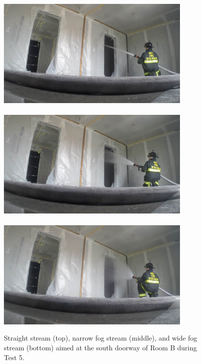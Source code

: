 \documentclass[12pt,oneside]{book}
\begin{document}
\begin{figure}[!ht]
	\includegraphics[trim=23cm 6.5cm 4cm 6cm, clip=true, width=3.75in]{../Figures/Pictures/SS_Room_B_Test_34}
	\\~\\
	\includegraphics[trim=23cm 6.5cm 4cm 6cm, clip=true, width=3.75in]{../Figures/Pictures/NF_Room_B_Test_34}
	\\~\\
	\includegraphics[trim=23cm 6.5cm 4cm 6cm, clip=true, width=3.75in]{../Figures/Pictures/WF_Room_B_Test_34}
	\caption[Straight stream, narrow fog stream, and wide fog stream during Test 5.]{Straight stream (top), narrow fog stream (middle), and wide fog stream (bottom) aimed at the south doorway of Room B during Test 5.}
	\label{fig:test_5_pic}
\end{figure}
\end{document}
